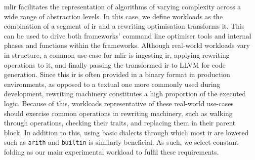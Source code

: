 \newpage %

\ac{mlir} facilitates the representation of algorithms of varying complexity across a wide range of abstraction levels.
In this case, we define workloads as the combination of a segment of \ac{ir} and a rewriting optimisation transforms it. This can be used to drive both frameworks' command line optimiser tools and internal phases and functions within the frameworks.
Although real-world workloads vary in structure, a common use-case for \ac{mlir} is ingesting \ac{ir}, applying rewriting operations to it, and finally passing the transformed \ac{ir} to LLVM for code generation. Since this \ac{ir} is often provided in a binary format in production environments, as opposed to a textual one more commonly used during development, rewriting machinery constitutes a high proportion of the executed logic.
Because of this, workloads representative of these real-world use-cases should exercise common operations in rewriting machinery, such as walking through operations, checking their traits, and replacing them in their parent block. In addition to this, using basic dialects through which most \acs{ir} are lowered such as \texttt{arith} and \texttt{builtin} is similarly beneficial.
As such, we select constant folding as our main experimental workload to fulfil these requirements.

